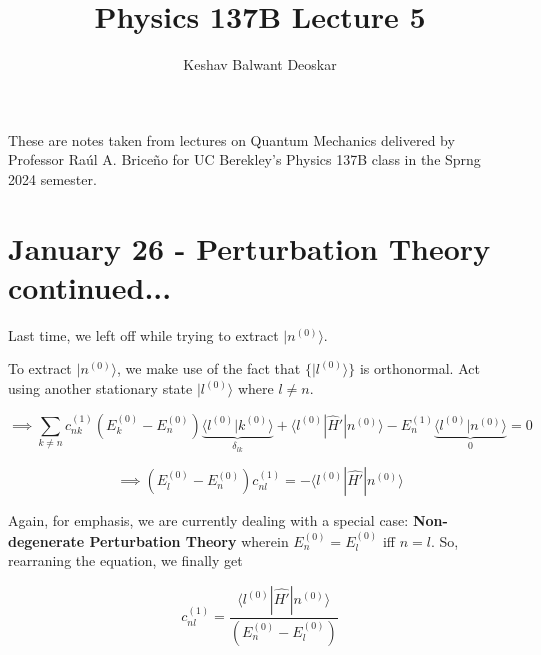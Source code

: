 \documentclass{article}
\title{Physics 137B Lecture 5}
\author{Keshav Balwant Deoskar}
\newcommand{\ket}[1]{|#1 \rangle}
\newcommand{\inner}[2]{\langle #1 | #2 \rangle}
\begin{document}
\maketitle

These are notes taken from lectures on Quantum Mechanics delivered by Professor Raúl A. Briceño for UC Berekley's Physics 137B class in the Sprng 2024 semester.

\tableofcontents

\pagebreak

\section{January 26 - Perturbation Theory continued...}


Last time, we left off while trying to extract $\ket{n^{(0)}}$.

\vskip 0.5cm 

To extract $\ket{n^{(0)}}$, we make use of the fact that $\{\ket{l^{(0)}}\}$ is orthonormal. Act using another stationary state $\ket{l^{(0)}}$ where $l \neq n$.

\[ \implies \sum_{k \neq n} c_{nk}^{(1)} \left( E_{k}^{(0)}  - E_n^{(0)} \right) \underbrace{\inner{l^{(0)}}{k^{(0)}}}_{\delta_{lk}} + \inner{l^{(0)}}{\hat{H}'| n^{(0)} } - E_n^{(1)} \underbrace{\inner{l^{(0)}}{n^{(0)}}}_{0} = 0 \]

\[ \implies \left( E_l^{(0)} - E_n^{(0)} \right) c_{nl}^{(1)} = - \inner{l^{(0)}}{\hat{H'} | n^{(0)}} \]

Again, for emphasis, we are currently dealing with a special case: \textbf{Non-degenerate Perturbation Theory} wherein $E_{n}^{(0)} = E_l^{(0)}$ iff $n=l$. So, rearraning the equation, we finally get 

\[ \boxed{ c_{nl}^{(1)} = \frac{\inner{l^{(0)}}{\hat{H'} | n^{(0)}}}{ \left( E_n^{(0)} - E_l^{(0)} \right) } } \]
\end{document}
